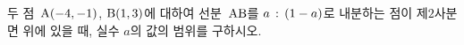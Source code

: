 두 점~$\mathrm{A}(-4{,}\mkern3mu\mathopen{}-1)$, $\mathrm{B}(1{,}\mkern3mu\mathopen{}3)$에 대하여 선분~$\mathrm{AB}$를 $a\mkern3mu :\mkern3mu (1-a)$로 내분하는 점이 제$2$사분면 위에 있을 때, 실수 $a$의 값의 범위를 구하시오.
